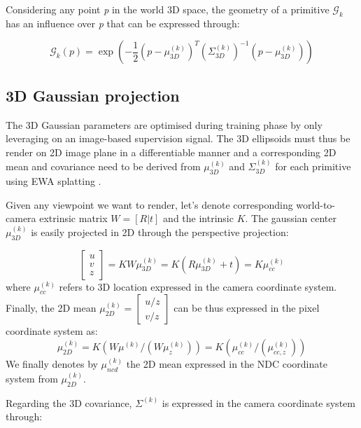 Considering any point \textit{p} in the world 3D space, the geometry of a primitive $\mathcal{G}_{k}$ has an influence over \textit{p} that can be expressed through: 

\begin{equation}
  \mathcal{G}_{k}(p) = \exp \left(-\frac{1}{2}(p-\mu^{(k)}_{3D})^{T}(\Sigma^{(k)}_{3D})^{-1}(p-\mu^{(k)}_{3D})\right)
\end{equation}

\subsection{3D Gaussian projection} The 3D Gaussian parameters are optimised during training phase by only leveraging on an image-based supervision signal. The 3D ellipsoids must thus be render on 2D image plane in a differentiable manner and a corresponding 2D mean and covariance need to be derived from $\mu^{(k)}_{3D}$ and $\Sigma^{(k)}_{3D}$ for each primitive using EWA splatting \cite{zwicker2001ewa}. 

Given any viewpoint we want to render, let's denote corresponding world-to-camera extrinsic matrix $W=[R|t]$ and the intrinsic $K$. The gaussian center $\mu^{(k)}_{3D}$ is easily projected in 2D through the perspective projection: 

\begin{equation}
  \begin{bmatrix}
    u \\
    v \\
    z
  \end{bmatrix} = KW\mu^{(k)}_{3D} = K(R\mu^{(k)}_{3D}+t) = K \mu^{(k)}_{cc}
\end{equation}
where $\mu^{(k)}_{cc}$ refers to 3D location expressed in the camera coordinate system. Finally, the 2D mean $\mu^{(k)}_{2D} = \begin{bmatrix}
  u/z \\
  v/z
\end{bmatrix}$ can be  thus expressed in the pixel coordinate system as:
\begin{equation}
  \mu^{(k)}_{2D} = K(W\mu^{(k)}/(W\mu^{(k)}_{z})) = K(\mu^{(k)}_{cc}/(\mu^{(k)}_{cc,z}))
\end{equation}
We finally denotes by $\mu^{(k)}_{ncd}$ the 2D mean expressed in the NDC coordinate system from $\mu^{(k)}_{2D}$. 

Regarding the 3D covariance, $\Sigma^{(k)}$ is expressed in the camera coordinate system through: 

